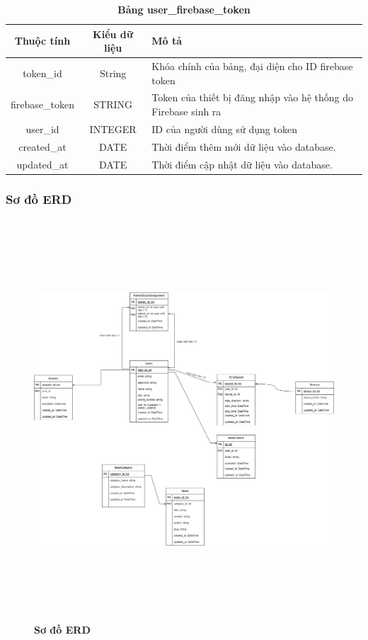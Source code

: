 \begin{table}[H]
  \caption{\bfseries \fontsize{12pt}{0pt}\selectfont Bảng user\_firebase\_token}
  \centering
  \begin{tabularx}{0.9\textwidth}{|c|c|X|}
    \hline
    \textbf{Thuộc tính} & \textbf{Kiểu dữ liệu} & \textbf{Mô tả} \\
    \hline
    token\_id & String & Khóa chính của bảng, đại diện cho ID firebase token \\
    \hline
    firebase\_token & STRING & Token của thiết bị đăng nhập vào hệ thống do Firebase sinh ra \\
    \hline
    user\_id & INTEGER & ID của người dùng sử dụng token \\
    \hline
    created\_at & DATE & Thời điểm thêm mới dữ liệu vào database. \\
    \hline
    updated\_at & DATE & Thời điểm cập nhật dữ liệu vào database. \\
    \hline
  \end{tabularx}
\end{table}

\subsubsection{Sơ đồ ERD}

\begin{figure}[H]
  \centering
  \includegraphics[width=15cm,height=15cm]{Images/server/database/fmECG_architecture-Database.drawio.png}
  \caption[Sơ đồ ERD]{\bfseries \fontsize{12pt}{0pt}\selectfont Sơ đồ ERD}
  \label{fmECG_architecture-Database} %
\end{figure}



